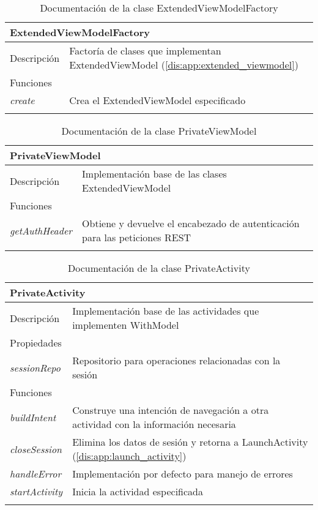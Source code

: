 \begin{longtable}{|p{} p{}|}
    \hline
    \multicolumn{2}{|l|}{\textbf{ExtendedViewModelFactory}} \\ \hline \hline
    Descripción      & Factoría de clases que implementan ExtendedViewModel (\ref{dis:app:extended_viewmodel}) \\ \hline
    \multicolumn{2}{|l|}{Funciones} \\
    \emph{create}  & Crea el ExtendedViewModel especificado  \\ \hline
    \caption{Documentación de la clase ExtendedViewModelFactory}
    \label{dis:app:extended_viewmodel_factory}
\end{longtable}

\begin{longtable}{|p{} p{}|}
    \hline
    \multicolumn{2}{|l|}{\textbf{PrivateViewModel}} \\ \hline \hline
    Descripción      & Implementación base de las clases ExtendedViewModel \\ \hline
    \multicolumn{2}{|l|}{Funciones} \\
    \emph{getAuthHeader}  & Obtiene y devuelve el encabezado de autenticación para las peticiones REST  \\ \hline
    \caption{Documentación de la clase PrivateViewModel}
    \label{dis:app:private_viewmodel}
\end{longtable}

\begin{longtable}{|p{} p{}|}
    \hline
    \multicolumn{2}{|l|}{\textbf{PrivateActivity}} \\ \hline \hline
    Descripción      & Implementación base de las actividades que implementen WithModel \\ \hline
    \multicolumn{2}{|l|}{Propiedades} \\
    \emph{sessionRepo}  & Repositorio para operaciones relacionadas con la sesión  \\ \hline
    \multicolumn{2}{|l|}{Funciones} \\
    \emph{buildIntent}  & Construye una intención de navegación a otra actividad con la información necesaria \\ 
    \emph{closeSession}  & Elimina los datos de sesión y retorna a LaunchActivity (\ref{dis:app:launch_activity}) \\
    \emph{handleError}  & Implementación por defecto para manejo de errores  \\ 
    \emph{startActivity}  & Inicia la actividad especificada  \\ \hline
    \caption{Documentación de la clase PrivateActivity}
    \label{dis:app:private_activity}
\end{longtable}

